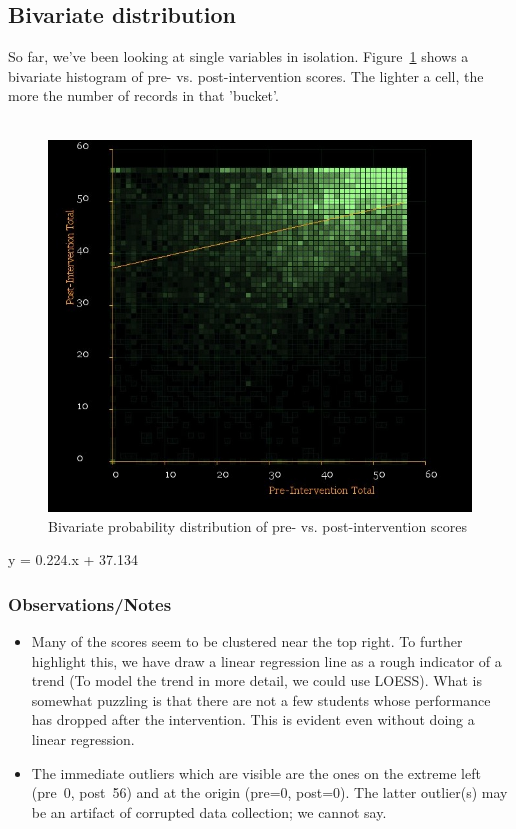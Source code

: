 \documentclass[10pt]{article}
\begin{document}
\subsection{Bivariate distribution}
So far, we've been looking at single variables in isolation. Figure~\ref{BivariatePrePost} shows a bivariate histogram of pre- vs. post-intervention scores. The lighter a cell, the more the number of records in that 'bucket'.\\\\
\begin{figure}
\caption{Bivariate probability distribution of pre- vs. post-intervention scores}
\label{BivariatePrePost}
\begin{center}
\includegraphics[width=160mm]{ReportMedia/BivariatePrePost.jpg}
\end{center}
\end{figure}
y = 0.224.x + 37.134
\subsubsection{Observations/Notes}
\begin{itemize}
\item Many of the scores seem to be clustered near the top right. To further highlight this, we have draw a linear regression line as a rough indicator of a trend (To model the trend in more detail, we could use LOESS). What is somewhat puzzling is that there are not a few students whose performance has dropped after the intervention. This is evident even without doing a linear regression.
\item The immediate outliers which are visible are the ones on the extreme left (pre~0, post~56) and at the origin (pre=0, post=0). The latter outlier(s) may be an artifact of corrupted data collection; we cannot say.
\end{itemize}
\end{document}
